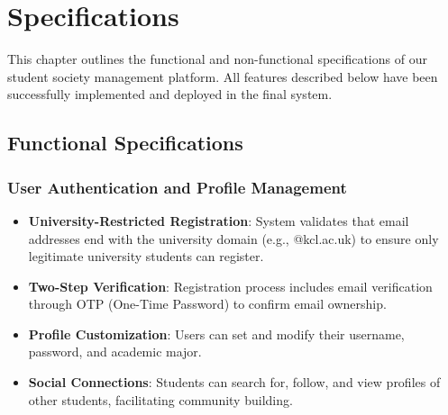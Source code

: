 \chapter{Specifications}

This chapter outlines the functional and non-functional specifications of our student society management platform. All features described below have been successfully implemented and deployed in the final system.

\section{Functional Specifications}

\subsection{User Authentication and Profile Management}
\begin{itemize}
    \item \textbf{University-Restricted Registration}: System validates that email addresses end with the university domain (e.g., @kcl.ac.uk) to ensure only legitimate university students can register.
    \item \textbf{Two-Step Verification}: Registration process includes email verification through OTP (One-Time Password) to confirm email ownership.
    \item \textbf{Profile Customization}: Users can set and modify their username, password, and academic major.
    \item \textbf{Social Connections}: Students can search for, follow, and view profiles of other students, facilitating community building.
\end{itemize}

